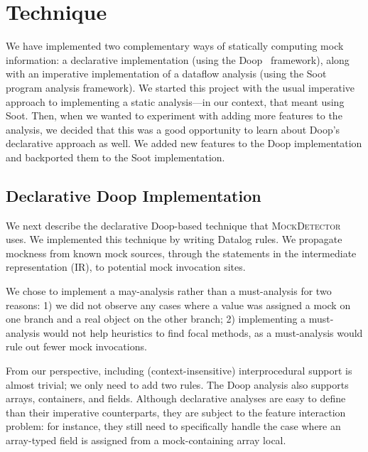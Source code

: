 \section{Technique}
\label{sec:technique}

We have implemented two complementary ways of statically computing mock information: 
a declarative implementation (using the Doop~\cite{bravenboer09:_stric_declar_specif_sophis_point_analy} framework), along with
an imperative implementation of a dataflow analysis (using the Soot~\cite{Vallee-Rai:1999:SJB:781995.782008} program analysis framework). We started this project with the usual imperative approach to implementing a static analysis---in our context, that meant using Soot. Then, when we wanted to experiment with adding more features to the analysis, we decided that this was a good opportunity to learn about Doop's declarative approach as well. We added new features to the Doop implementation and backported them to the Soot implementation. 

\subsection{Declarative Doop Implementation}
\label{sec:dec-doop}
We next describe the declarative Doop-based technique that \textsc{MockDetector} uses. We implemented this technique by writing Datalog rules. We propagate mockness from known mock sources, through the statements in the intermediate representation (IR), to potential mock invocation sites. 

We chose to implement a may-analysis rather than a must-analysis for two reasons: 1) we did not observe any cases where a value was assigned a mock on one branch and a real object on the other branch; 2) implementing a must-analysis would not help heuristics to find focal methods, as a must-analysis would rule out fewer mock invocations. 

From our perspective, including (context-insensitive) interprocedural support is almost trivial; we only need to add two rules. The Doop analysis also supports arrays, containers, and fields. Although declarative analyses are easy to define than their imperative counterparts, they are subject to the feature interaction problem: for instance, they still need to specifically handle the case where an array-typed field is assigned from a mock-containing array local.

